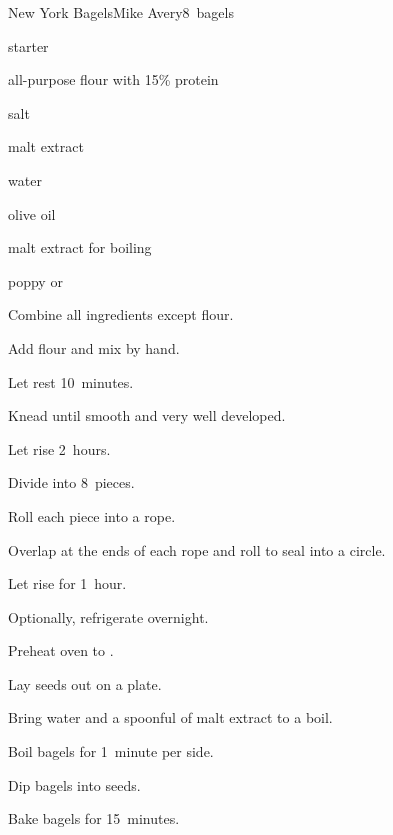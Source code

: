 \begin{recipe}{New York Bagels}{Mike Avery}{8~bagels}

\begin{ingredients}
\item {} starter
\item {} all-purpose flour with 15\% protein
\item {} salt
\item {} malt extract
\item {} water
\item {} olive oil
\item malt extract for boiling
\item poppy or 
\end{ingredients}

\begin{directions}
\item Combine all ingredients except flour.
\item Add flour and mix by hand.
\item Let rest 10~minutes.
\item Knead until smooth and very well developed.
\item Let rise 2~hours.
\item Divide into 8~pieces.
\item Roll each piece into a  rope.
\item Overlap  at the ends of each rope and roll to seal into a circle.
\item Let rise for 1~hour.
\item Optionally, refrigerate overnight.
\item Preheat oven to .
\item Lay seeds out on a plate.
\item Bring water and a spoonful of malt extract to a boil.
\item Boil bagels for 1~minute per side.
\item Dip bagels into seeds.
\item Bake bagels for 15~minutes.
\end{directions}

\end{recipe}
